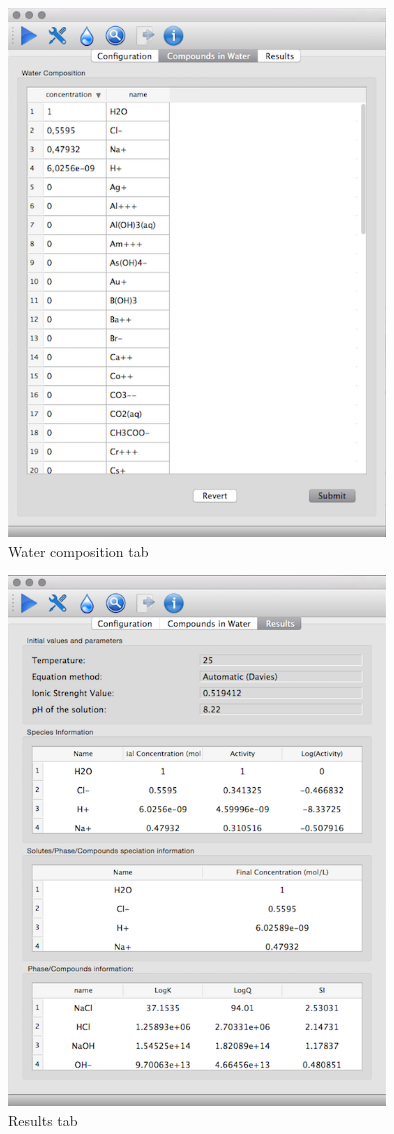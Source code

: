 \begin{figure}[ht!]
\centering
\includegraphics[width=100mm]{figures/shpeck-watertab.png}
\caption{Water composition tab}
\label{fig:water}
\end{figure}

\begin{figure}[ht!]
\centering
\includegraphics[width=100mm]{figures/shpeck-resultstab.png}
\caption{Results tab}
\label{fig:output}
\end{figure}

